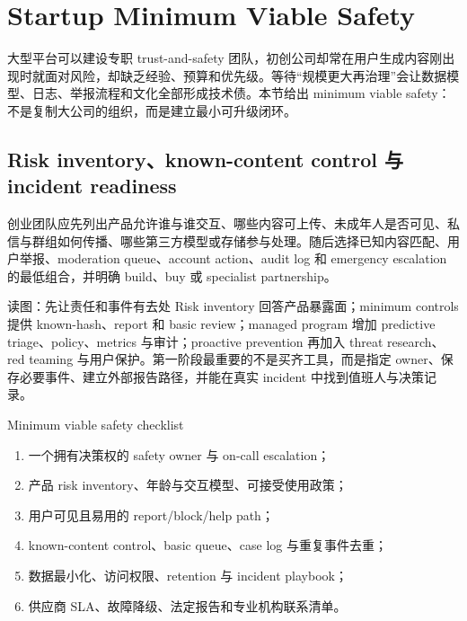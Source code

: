 \section{Startup Minimum Viable Safety}

大型平台可以建设专职 trust-and-safety 团队，初创公司却常在用户生成内容刚出现时就面对风险，却缺乏经验、预算和优先级。等待“规模更大再治理”会让数据模型、日志、举报流程和文化全部形成技术债。本节给出 minimum viable safety：不是复制大公司的组织，而是建立最小可升级闭环。

\subsection{Risk inventory、known-content control 与 incident readiness}

创业团队应先列出产品允许谁与谁交互、哪些内容可上传、未成年人是否可见、私信与群组如何传播、哪些第三方模型或存储参与处理。随后选择已知内容匹配、用户举报、moderation queue、account action、audit log 和 emergency escalation 的最低组合，并明确 build、buy 或 specialist partnership。


\begin{knowledgebox}{读图：先让责任和事件有去处}
Risk inventory 回答产品暴露面；minimum controls 提供 known-hash、report 和 basic review；managed program 增加 predictive triage、policy、metrics 与审计；proactive prevention 再加入 threat research、red teaming 与用户保护。第一阶段最重要的不是买齐工具，而是指定 owner、保存必要事件、建立外部报告路径，并能在真实 incident 中找到值班人与决策记录。
\end{knowledgebox}

\begin{importantbox}{Minimum viable safety checklist}
\begin{enumerate}
  \item 一个拥有决策权的 safety owner 与 on-call escalation；
  \item 产品 risk inventory、年龄与交互模型、可接受使用政策；
  \item 用户可见且易用的 report/block/help path；
  \item known-content control、basic queue、case log 与重复事件去重；
  \item 数据最小化、访问权限、retention 与 incident playbook；
  \item 供应商 SLA、故障降级、法定报告和专业机构联系清单。
\end{enumerate}
\end{importantbox}

